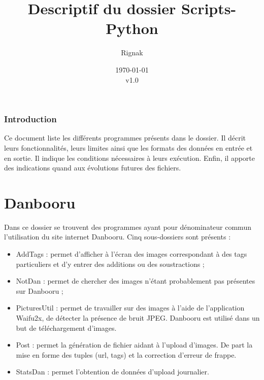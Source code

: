 \documentclass[a4paper,12pt]{article}
\title{Descriptif du dossier Scripts-Python}
\author{Rignak}
\date{\today\\v1.0}
\begin{document}
\maketitle
\clearpage 
{}\setcounter{tocdepth}{2}
\tableofcontents
\clearpage 




\section{Introduction}

Ce document liste les différents programmes présents dans le dossier. Il décrit leurs fonctionnalités, leurs limites ainsi que les formats des données en entrée et en sortie. Il indique les conditions nécessaires à leurs exécution. Enfin, il apporte des indications quand aux évolutions futures des fichiers.

\part{Danbooru}
Dans ce dossier se trouvent des programmes ayant pour dénominateur commun l'utilisation du site internet Danbooru. 
Cinq sous-dossiers sont présents :
\begin{itemize}
\item AddTags : permet d'afficher à l'écran des images correspondant à des tags particuliers et d'y entrer des additions ou des soustractions ;
\item NotDan : permet de chercher des images n'étant probablement pas présentes sur Danbooru ;
\item PicturesUtil : permet de travailler sur des images à l'aide de l'application Waifu2x, de détecter la présence de bruit JPEG. Danbooru est utilisé dans un but de téléchargement d'images.
\item Post : permet la génération de fichier aidant à l'upload d'images. De part la mise en forme des tuples (url, tags) et la correction d'erreur de frappe.
\item StatsDan : permet l'obtention de données d'upload journalier.
\end{itemize}
\end{document}
